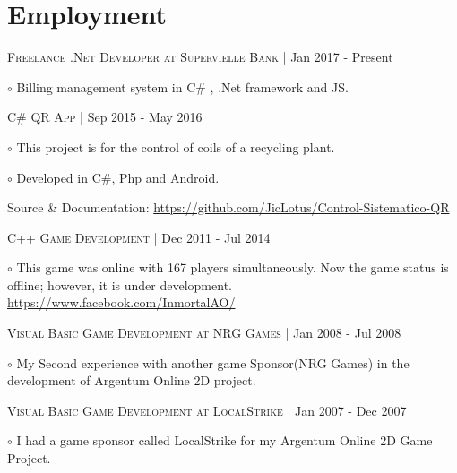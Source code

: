 \documentclass[letterpaper]{article}
\renewenvironment{itemize}{
  \begin{list}{}{
    \setlength{\leftmargin}{1.5em}
  }
}{
  \end{list}
}
\newenvironment{no-indent-itemize}{
  \begin{list}{}{
    \setlength{\leftmargin}{0em}
  }
}{
  \end{list}
}
\def\bullet{$\circ$\xspace}
\begin{document}
\section*{Employment}
\begin{no-indent-itemize}

    \item\textsc{Freelance .Net Developer at Supervielle Bank} | Jan 2017 - Present
    \begin{itemize}
    \item\bullet Billing management system in C\# , .Net framework and JS.
    \end{itemize}
    
    \item \textsc{C\# QR App} | Sep 2015 - May 2016
    \begin{itemize} 
    \item\bullet 
    This project is for the control of coils of a recycling plant. 
    \item\bullet Developed in C\#, Php and Android. 
    \end{itemize}
    \begin{itemize}
    \item
    Source \& Documentation:
    \href{https://github.com/JicLotus/Control-Sistematico-QR}{https://github.com/JicLotus/Control-Sistematico-QR}
    \end{itemize}


    \item\textsc{C++ Game Development} | Dec 2011 - Jul 2014
    \begin{itemize} \item\bullet
    This game was online with 167 players simultaneously. Now the game status is offline; however, it is under development. \href{https://www.facebook.com/InmortalAO/}{https://www.facebook.com/InmortalAO/}
    \end{itemize}

    \item\textsc{Visual Basic Game Development at NRG Games} | Jan 2008 - Jul 2008 
    \begin{itemize} \item\bullet
    My Second experience with another game Sponsor(NRG Games) in the development of Argentum Online 2D project. 
    \end{itemize}

    \item \textsc{Visual Basic Game Development at LocalStrike} | Jan 2007 - Dec 2007
    \begin{itemize} \item\bullet
    I had a game sponsor called LocalStrike for my Argentum Online 2D Game Project.
    \end{itemize}

\end{no-indent-itemize}
\end{document}
